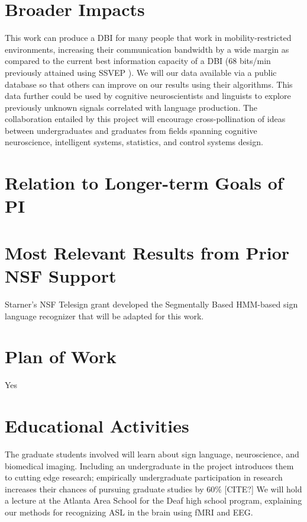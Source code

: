 \documentclass{proposal}
\begin{document}
\section{Broader Impacts}

This work can produce a DBI for many people that work in mobility-restricted environments, increasing their communication bandwidth by a wide margin as compared to the current best information capacity of a DBI (68 bits/min previously attained using SSVEP \cite{gao2003bbe}). We will our data available via a public database so that others can improve on our results using their algorithms. This data further could be used by cognitive neuroscientists and linguists to explore previously unknown signals correlated with language production. The collaboration entailed by this project will encourage cross-pollination of ideas between undergraduates and graduates from fields spanning cognitive neuroscience, intelligent systems, statistics, and control systems design.


\section{Relation to Longer-term Goals of PI}

\section{Most Relevant Results from Prior NSF Support}

Starner's NSF Telesign grant developed the Segmentally Based HMM-based sign language recognizer that will be adapted for this work.


\section{Plan of Work}

Yes

\section{Educational Activities}

The graduate students involved will learn about sign language, neuroscience, and biomedical imaging. Including an undergraduate in the project introduces them to cutting edge research; empirically undergraduate participation in research increases their chances of pursuing graduate studies by 60\% [CITE?] We will hold a lecture at the Atlanta Area School for the Deaf high school program, explaining our methods for recognizing ASL in the brain using fMRI and EEG.




\end{document}
